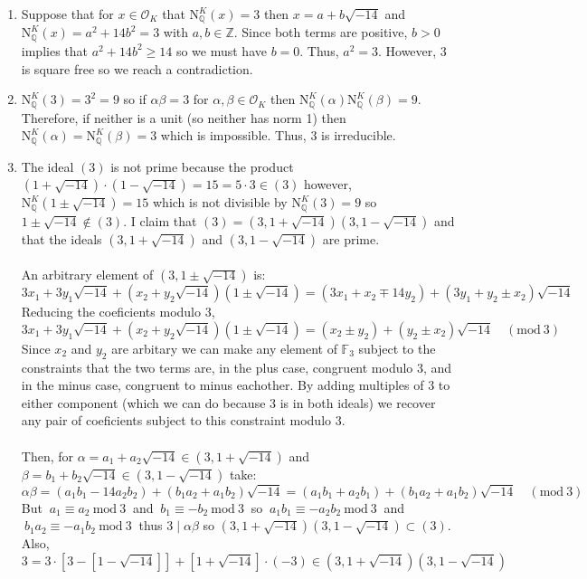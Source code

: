 \documentclass[12pt]{extarticle}
\newcommand{\divides}{\mid}
\newcommand{\Z}{\mathbb{Z}}
\newcommand{\Q}{\mathbb{Q}}
\renewcommand{\mod}[3]{\: #1 \equiv #2 \: \mathrm{mod} \: #3 \:}
\newcommand{\finfield}[1]{\mathbb{F}_{#1}}
\newcommand{\ints}[1]{\mathcal{O}_{#1}}
\newcommand{\qnorm}[2]{\mathrm{N}^{#1}_{\Q}\left(#2\right)}
\begin{document}
\begin{enumerate}
\begin{enumerate}
\item Suppose that for $x \in \ints{K}$ that $\qnorm{K}{x} = 3$ then $x = a + b\sqrt{-14}$ and $\qnorm{K}{x} = a^2 + 14 b^2 = 3$ with $a, b \in \Z$. Since both terms are positive, $b > 0$ implies that $a^2 + 14 b^2 \ge 14$ so we must have $b = 0$. Thus, $a^2 = 3$. However, $3$ is square free so we reach a contradiction.  

\item $\qnorm{K}{3} = 3^2 = 9$ so if $\alpha \beta = 3$ for $\alpha, \beta \in \ints{K}$ then $\qnorm{K}{\alpha} \qnorm{K}{\beta} = 9$. Therefore, if neither is a unit (so neither has norm 1) then $\qnorm{K}{\alpha} = \qnorm{K}{\beta} = 3$ which is impossible. Thus, $3$ is irreducible. 

\item The ideal $(3)$ is not prime because the product $(1 + \sqrt{-14}) \cdot (1 - \sqrt{-14}) = 15 = 5 \cdot 3 \in (3)$ however, $\qnorm{K}{1 \pm \sqrt{-14}} = 15$ which is not divisible by $\qnorm{K}{3} = 9$ so $1 \pm \sqrt{-14} \notin (3)$. I claim that $(3) = (3, 1 + \sqrt{-14}) (3, 1 - \sqrt{-14})$ and that the ideals $(3, 1 + \sqrt{-14})$ and $(3, 1 - \sqrt{-14})$ are prime. \\\\
An arbitrary element of $(3, 1 \pm \sqrt{-14})$ is: \[3x_1 + 3y_1 \sqrt{-14} + (x_2 + y_2 \sqrt{-14})(1 \pm \sqrt{-14}) = (3x_1 + x_2 \mp 14 y_2) + (3y_1 + y_2 \pm x_2) \sqrt{-14}\] 
Reducing the coeficients modulo $3$,
\[3x_1 + 3y_1 \sqrt{-14} + (x_2 + y_2 \sqrt{-14})(1 \pm \sqrt{-14}) = (x_2 \pm y_2) + (y_2 \pm x_2) \sqrt{-14} \quad ( \text{mod} \: 3) \] 
Since $x_2$ and $y_2$ are arbitary we can make any element of $\finfield{3}$ subject to the constraints that the two terms are, in the plus case, congruent modulo $3$, and in the minus case, congruent to minus eachother. By adding multiples of $3$ to either component (which we can do because $3$ is in both ideals) we recover any pair of coeficients subject to this constraint modulo $3$. \\ \\
Then, for $\alpha = a_1 + a_2 \sqrt{-14} \in (3, 1 + \sqrt{-14})$ and $\beta = b_1 + b_2 \sqrt{-14} \in (3, 1 - \sqrt{-14})$ take:
\[\alpha \beta = (a_1 b_1 - 14 a_2 b_2) + (b_1 a_2 + a_1 b_2) \sqrt{-14} = (a_1 b_1 + a_2 b_1) + (b_1 a_2 + a_1 b_2) \sqrt{-14} \quad ( \text{mod} \: 3) \]
But $\mod{a_1}{a_2}{3}$ and $\mod{b_1}{-b_2}{3}$ so $\mod{a_1 b_1}{-a_2 b_2}{3}$ and $\mod{b_1 a_2}{-a_1 b_2}{3}$ thus $3 \divides \alpha \beta$ so $(3, 1 + \sqrt{-14}) (3, 1 - \sqrt{-14}) \subset (3)$. Also, \[3 = 3 \cdot [3 - [1  - \sqrt{-14}]] + [1 + \sqrt{-14}] \cdot (-3) \in (3, 1 + \sqrt{-14}) (3, 1 - \sqrt{-14})\]

\end{enumerate}
\end{enumerate}
\end{document}

